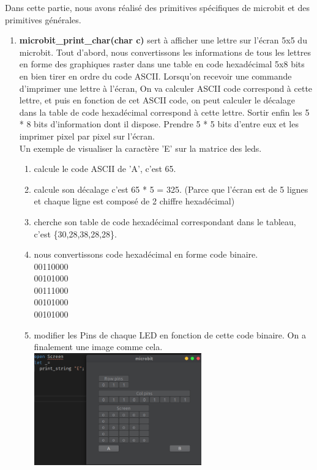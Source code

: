 \documentclass[14px]{article}
\begin{document}
	Dans cette partie, nous avons réalisé des primitives spécifiques de microbit et des primitives générales.
	\begin{enumerate}
		\item \textbf{microbit\_print\_char(char c)} sert à afficher une lettre sur l'écran 5x5 du microbit.
		Tout d'abord, nous convertissons les informations de tous les lettres en forme des graphiques raster dans une table en code hexadécimal 5x8 bits en bien tirer en ordre du code ASCII. Lorsqu'on recevoir une commande d'imprimer une lettre à l'écran,
		On va calculer ASCII code correspond à cette lettre, et puis en fonction de cet ASCII code, on peut calculer le décalage dans la table de code hexadécimal correspond à cette lettre. Sortir enfin les 5 * 8 bits d'information dont il dispose. Prendre 5 * 5 bits d'entre eux et les imprimer pixel par pixel sur l'écran.\\

		Un exemple de visualiser la caractère 'E' sur la matrice des leds.
		\begin{enumerate}
			\item calcule le code ASCII de 'A', c'est 65.
			\item calcule son décalage c'est 65 * 5 = 325. (Parce que l'écran est de 5 lignes et chaque ligne est composé de 2 chiffre hexadécimal)
			\item cherche son table de code hexadécimal correspondant dans le tableau, c'est \{30,28,38,28,28\}.
			\item nous convertissons code hexadécimal en forme code binaire.\\
			00110000\\
			00101000\\
			00111000\\
			00101000\\
			00101000
			\item modifier les Pins de chaque LED en fonction de cette code binaire. On a finalement une image comme cela.\\
			\includegraphics[width=0.6\textwidth]{printE.png}\\[1cm]
		\end{enumerate}


\end{enumerate}
\end{document}
